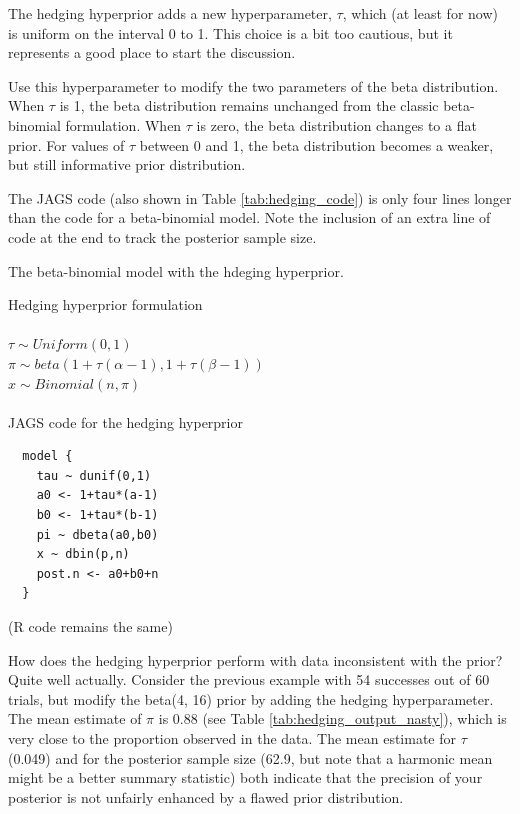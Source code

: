 \documentclass[12pt]{article}
\begin{document}
The hedging hyperprior adds a new hyperparameter, $\tau$, which (at least for now) is uniform on the interval 0 to 1. This choice is a bit too cautious, but it represents a good place to start the discussion.

Use this hyperparameter to modify the two parameters of the beta distribution. When $\tau$ is 1, the beta distribution remains unchanged from the classic beta-binomial formulation. When $\tau$ is zero, the beta distribution changes to a flat prior. For values of $\tau$ between 0 and 1, the beta distribution becomes a weaker, but still informative prior distribution.

The JAGS code (also shown in Table \ref{tab:hedging_code}) is only four lines longer than the code for a beta-binomial model. Note the inclusion of an extra line of code at the end to track the posterior sample size.

\linespread{1}

\begin{table}
\caption{The beta-binomial model with the hdeging hyperprior.\label{tab:hedging_code}}

Hedging hyperprior formulation \\
\\
$\tau \sim Uniform(0, 1)$\\
$\pi \sim beta(1+\tau(\alpha-1), 1+\tau(\beta-1))$\\
$x \sim Binomial(n, \pi)$\\
\\
JAGS code for the hedging hyperprior

\begin{verbatim}
  model {
    tau ~ dunif(0,1)
    a0 <- 1+tau*(a-1)
    b0 <- 1+tau*(b-1)
    pi ~ dbeta(a0,b0)
    x ~ dbin(p,n)
    post.n <- a0+b0+n
  }

\end{verbatim}
(R code remains the same)
\end{table}

\linespread{1.6}

How does the hedging hyperprior perform with data inconsistent with the prior? Quite well actually. Consider the previous example with 54 successes out of 60 trials, but modify the beta(4, 16) prior by adding the hedging hyperparameter. The mean estimate of $\pi$ is 0.88 (see Table \ref{tab:hedging_output_nasty}), which is very close to the proportion observed in the data. The mean estimate for $\tau$ (0.049) and for the posterior sample size (62.9, but note that a harmonic mean might be a better summary statistic) both indicate that the precision of your posterior is not unfairly enhanced by a flawed prior distribution.
\end{document}
